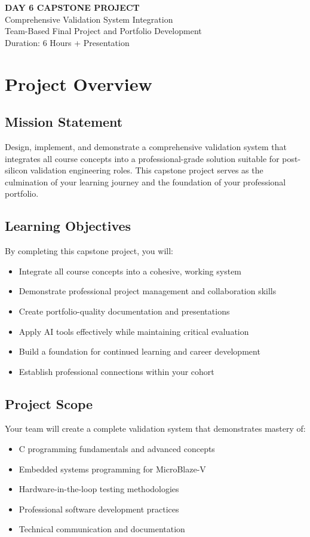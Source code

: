 \documentclass[11pt,a4paper]{article}
\begin{document}
\begin{center}
    {\Huge\bfseries\color{codeblue} DAY 6 CAPSTONE PROJECT}\\[0.5cm]
    {\Large Comprehensive Validation System Integration}\\[0.3cm]
    {\large Team-Based Final Project and Portfolio Development}\\[0.2cm]
    {\normalsize Duration: 6 Hours + Presentation}
\end{center}

\vspace{1cm}

\section{Project Overview}

\subsection{Mission Statement}
Design, implement, and demonstrate a comprehensive validation system that integrates all course concepts into a professional-grade solution suitable for post-silicon validation engineering roles. This capstone project serves as the culmination of your learning journey and the foundation of your professional portfolio.

\subsection{Learning Objectives}
By completing this capstone project, you will:
\begin{itemize}
    \item Integrate all course concepts into a cohesive, working system
    \item Demonstrate professional project management and collaboration skills
    \item Create portfolio-quality documentation and presentations
    \item Apply AI tools effectively while maintaining critical evaluation
    \item Build a foundation for continued learning and career development
    \item Establish professional connections within your cohort
\end{itemize}

\subsection{Project Scope}
Your team will create a complete validation system that demonstrates mastery of:
\begin{itemize}
    \item C programming fundamentals and advanced concepts
    \item Embedded systems programming for MicroBlaze-V
    \item Hardware-in-the-loop testing methodologies
    \item Professional software development practices
    \item Technical communication and documentation
\end{itemize}
\end{document}
